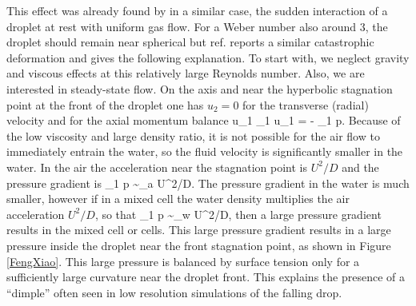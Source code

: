 This effect was already found by \cite{Xiao:2014vs} in a similar case, 
the sudden interaction of a droplet at rest with uniform gas flow. 
For a Weber number also around 3, the droplet should remain near spherical 
but ref. \cite{Xiao:2014vs} reports a similar catastrophic deformation and 
gives the following explanation. To start with, we neglect gravity and viscous 
effects at this relatively large Reynolds number. Also, we are interested 
in steady-state flow. On the axis and near the hyperbolic stagnation point 
at the front of the droplet one has $u_2=0$ for the transverse (radial) 
velocity and for the axial momentum balance
\be
u_1 \partial_1 u_1 = -  \rho \partial_1 p.
\nd
Because of the low viscosity and large density ratio, it is not possible 
for the air flow to immediately entrain the water, so the fluid velocity is 
significantly smaller in the water. 
In the air the acceleration near the stagnation point is $U^2/D$ and 
the pressure gradient is
\be
\partial_1 p \sim \rho_{a} U^2/D.
\nd
The pressure gradient in the water is much smaller, however if in a mixed cell 
the water density multiplies the air acceleration $U^2/D$, so that
\be
\partial_1 p \sim \rho_{w} U^2/D,
\nd
then a large pressure gradient results in the mixed cell or cells. This large 
pressure gradient results in a large pressure inside the droplet near the front 
stagnation point, as shown in Figure \ref{FengXiao}. 
This large pressure is balanced by surface tension only for a sufficiently large 
curvature near the droplet front. This explains the presence of a ``dimple'' 
often seen in low resolution simulations of the falling drop. 
